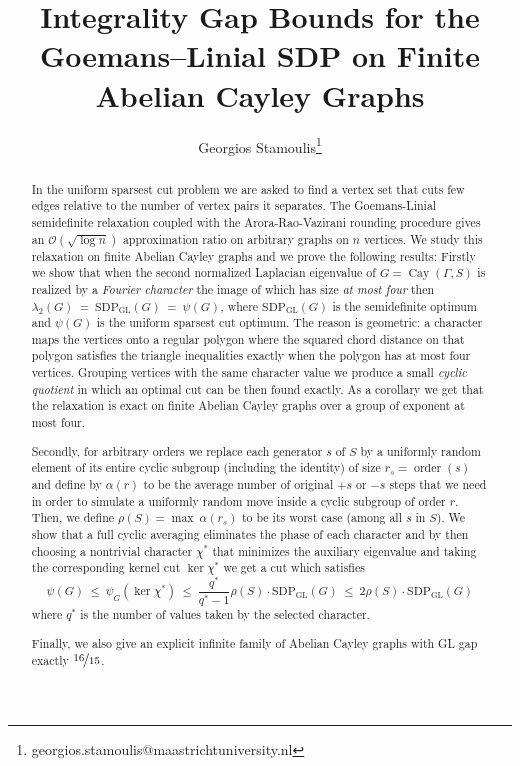 \documentclass[11pt]{article}
\title{\textbf{Integrality Gap Bounds for the Goemans–Linial SDP on Finite Abelian Cayley Graphs}}
\author{Georgios Stamoulis\thanks{georgios.stamoulis@maastrichtuniversity.nl}}
\affil{Department of Advanced Computing Sciences \\ Maastricht University \\ The Netherlands}
\date{}
\theoremstyle{definition}
\theoremstyle{remark}
\newcommand{\Cay}{\operatorname{Cay}}
\newcommand{\gl}{\operatorname{SDP_{GL}}}
\begin{document}
\maketitle


\begin{abstract}
In the uniform sparsest cut problem we are asked to find a vertex set that cuts few edges relative to the number of vertex pairs it separates.  The  Goemans-Linial semidefinite relaxation coupled with the Arora-Rao-Vazirani rounding procedure gives an $\mathcal{O}(\sqrt{\log n})$ approximation ratio on arbitrary graphs on $n$ vertices. We study this relaxation on finite Abelian Cayley graphs and we prove the following results: Firstly we show that when the second normalized Laplacian eigenvalue of $G= \Cay(\Gamma, S)$ is realized by a \emph{Fourier character} the image of which has size \emph{at most four} then $\lambda_2(G) ~=~ \gl (G) ~=~ \psi(G)$, where $\gl(G)$ is the semidefinite optimum and $\psi(G)$ is the uniform sparsest cut optimum.  The reason is geometric: a character maps the vertices onto a regular polygon where the squared chord distance on that polygon satisfies the triangle inequalities exactly when the polygon has at most four vertices.  Grouping vertices with the same character value we produce a small \emph{cyclic quotient} in which an optimal cut can be then found exactly.  As a corollary we get that the relaxation is exact on finite Abelian Cayley graphs over a group of exponent at most four.

Secondly, for arbitrary orders we replace each generator $s$ of $S$  by a uniformly random element of its entire cyclic subgroup (including the identity) of size $r_s=\operatorname{order}(s)$ and  define by $\alpha(r)$ to be the average number of original $+s$ or $-s$ steps that we need in order to simulate a uniformly random move inside a cyclic subgroup of order $r$. Then, we define $\rho(S) = \max ~\alpha(r_s)$ to be its worst case (among all $s$ in $S$). We show that a full cyclic averaging eliminates the phase of each character and by then choosing a nontrivial character $\chi^*$ that minimizes the auxiliary eigenvalue and taking the corresponding kernel cut $\ker \chi^*$ we get a cut which satisfies
\[
    \psi(G)
      ~\leq~ \psi_G(\ker \chi^*)
      ~\leq~ \frac{q^*}{q^*-1} \rho(S) \cdot \gl (G)
      ~\leq~ 2\rho(S) \cdot \gl(G)
\]
where $q^*$ is the number of values taken by the selected character. 

Finally, we also give an explicit infinite family of Abelian Cayley graphs with GL gap exactly $\nicefrac{16}{15}$.  
\end{abstract}
\end{document}
